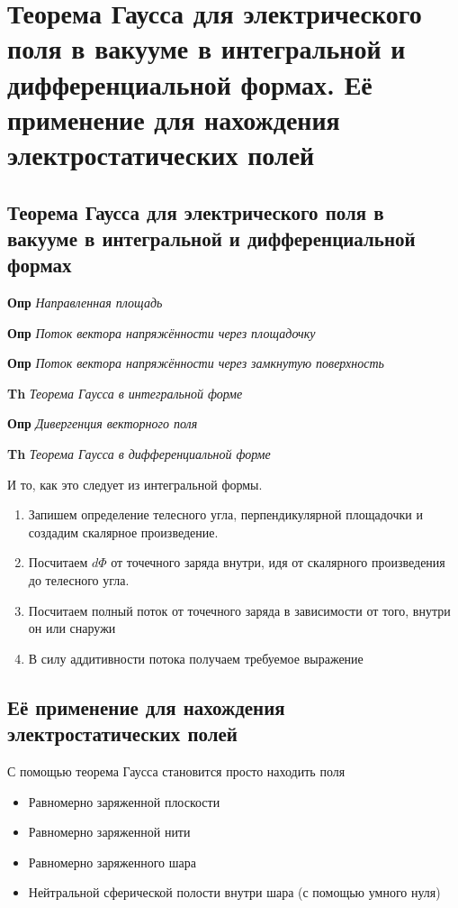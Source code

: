 \documentclass[a4paper, 14pt]{article}
\begin{document}
    \section{Теорема Гаусса для электрического поля в вакууме в интегральной и дифференциальной формах.
    Её применение для нахождения электростатических полей}
    
    \subsection{Теорема Гаусса для электрического поля в вакууме в интегральной и дифференциальной формах}
    
    \textbf{Опр} \textit{Направленная площадь}
    
    \textbf{Опр} \textit{Поток вектора напряжённости через площадочку}
    
    \textbf{Опр} \textit{Поток вектора напряжённости через замкнутую поверхность}
    
    \textbf{Th} \textit{Теорема Гаусса в интегральной форме}
    
    \textbf{Опр} \textit{Дивергенция векторного поля}
    
    \textbf{Th} \textit{Теорема Гаусса в дифференциальной форме}
    
    И то, как это следует из интегральной формы.
    
    \begin{enumerate}
        \item Запишем определение телесного угла, перпендикулярной площадочки и создадим скалярное произведение.
        \item Посчитаем $d \Phi$ от точечного заряда внутри, идя от скалярного произведения до телесного угла.
        \item Посчитаем полный поток от точечного заряда в зависимости от того, внутри он или снаружи
        \item В силу аддитивности потока получаем требуемое выражение
    \end{enumerate}
    
    \subsection{Её применение для нахождения электростатических полей}
    
    С помощью теорема Гаусса становится просто находить поля
    
    \begin{itemize}
        \item Равномерно заряженной плоскости
        \item Равномерно заряженной нити
        \item Равномерно заряженного шара
        \item Нейтральной сферической полости внутри шара (с помощью умного нуля)
    \end{itemize}
    
\end{document}
